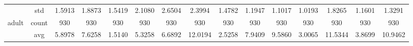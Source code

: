 \begin{table}[htbp]
{\begin{tabular}{rcccc|c|c|c|c|c|ccccc}
			                                                                               & std                                    & 1.5913                                                                             & 1.8873                                                                    & 1.5419                                                                    & 2.1080                                         & 2.6504                                                                    & 2.3994                                       & 1.4782                                      & 1.1947                                         & 1.1017                                         & 1.0193                                          & 1.8265                                          & 1.1601                                         & 1.3291                                         \\
			adult                                                                          & count                                  & 930                                                                                & 930                                                                       & 930                                                                       & 930                                            & 930                                                                       & 930                                          & 930                                         & 930                                            & 930                                            & 930                                             & 930                                             & 930                                            & 930                                            \\
			                                                                               & avg                                    & 5.8978                                                                             & 7.6258                                                                    & \cellcolor[rgb]{ .776,  .937,  .808}\textcolor[rgb]{ 0,  .38,  0}{1.5140} & 5.3258                                         & 6.6892                                                                    & 12.0194                                      & 2.5258                                      & 7.9409                                         & 9.5860                                         & 3.0065                                          & 11.5344                                         & 3.8699                                         & 10.9462                                        \\

\end{tabular}}
\end{table}
